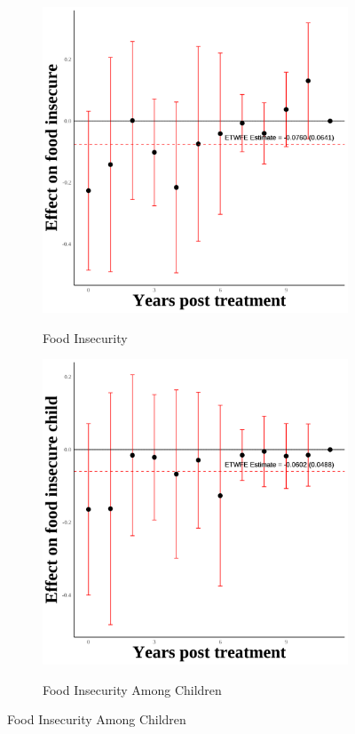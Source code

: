 \documentclass[12pt,english]{article}
\begin{document}
\begin{figure}[H]
  \begin{subfigure}[b]{0.3\textwidth}
    \centering
    \caption{Food Insecurity}
    \includegraphics[width=\linewidth]{figures/plot87-food_insecure_event_study-third-four.png}
    \label{fig:food-insecure-third-four}
  \end{subfigure}
  \hfill
  \begin{subfigure}[b]{0.3\textwidth}
    \centering
    \caption{Food Insecurity Among Children}
    \includegraphics[width=\linewidth]{figures/plot88-food_insecure_child_event_study-third-four.png}
    \label{fig:food-insecure-child-third-four}
  \end{subfigure}

\end{figure}
\end{document}
